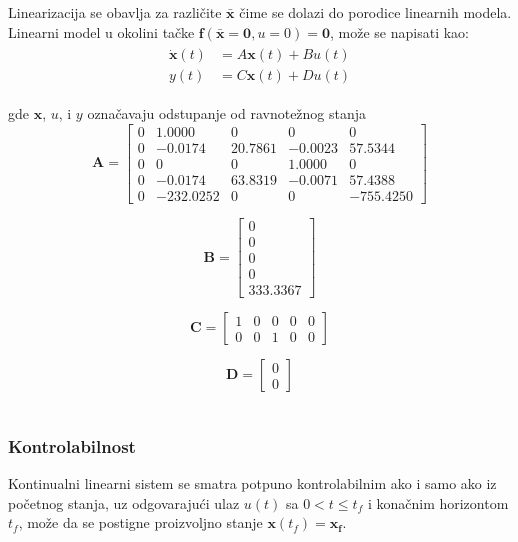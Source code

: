 \documentclass[a4paper,11pt]{article}
\theoremstyle{definition} \newtheorem{deff}{Definicija}[section]
\theoremstyle{definition} \newtheorem{prim}[deff]{Primer}
\theoremstyle{plain} \newtheorem{teor}[deff]{Teorema}
\newcommand{\vect}[1]{\boldsymbol{\mathbf{#1}}}
\begin{document}
	Linearizacija se obavlja za različite $\bar{\mathbf{x}}$ čime se dolazi do porodice linearnih modela. Linearni model u okolini tačke  $\vect{f}(\vect{\bar{x}} = \vect{0}, u = 0) = \vect{0}$, može se napisati kao:
	\begin{align}
		\begin{split}
			\vect{\dot{x}}(t) &= A\vect{x}(t) + Bu(t) \\
			y(t) &= C\vect{x}(t) + Du(t)
		\end{split}
		\label{eg:lin_mod}
	\end{align}
	
	
	gde  $\vect{x}$, $u$, i $y$ označavaju odstupanje od ravnotežnog stanja
	\[
	\mathbf{A} =
	\begin{bmatrix}
		0 & 1.0000 & 0 & 0 & 0 \\
		0 & -0.0174 & 20.7861 & -0.0023 & 57.5344 \\
		0 & 0 & 0 & 1.0000 & 0 \\
		0 & -0.0174 & 63.8319 & -0.0071 & 57.4388 \\
		0 & -232.0252 & 0 & 0 & -755.4250
	\end{bmatrix}
	\]
	
	\[
	\mathbf{B} =
	\begin{bmatrix}
		0 \\
		0 \\
		0 \\
		0 \\
		333.3367
	\end{bmatrix}
	\]
	
	\[
	\mathbf{C} =
	\begin{bmatrix}
		1 & 0 & 0 & 0 & 0 \\
		0 & 0 & 1 & 0 & 0
	\end{bmatrix}
	\]
	
	\[
	\mathbf{D} =
	\begin{bmatrix}
		0 \\
		0
	\end{bmatrix}
	\] \\[16pt]
	
	
	\subsubsection{Kontrolabilnost} \label{sec:kontrolabilnost}
	
	Kontinualni linearni sistem se smatra potpuno kontrolabilnim ako i samo ako iz početnog stanja, uz odgovarajući ulaz $u(t)$ sa $0 < t \leq t_f$ i konačnim horizontom $t_f$, može da se postigne
	proizvoljno stanje $\vect{x}(t_f) = \vect{x_f}$. \\
	
\end{document}
